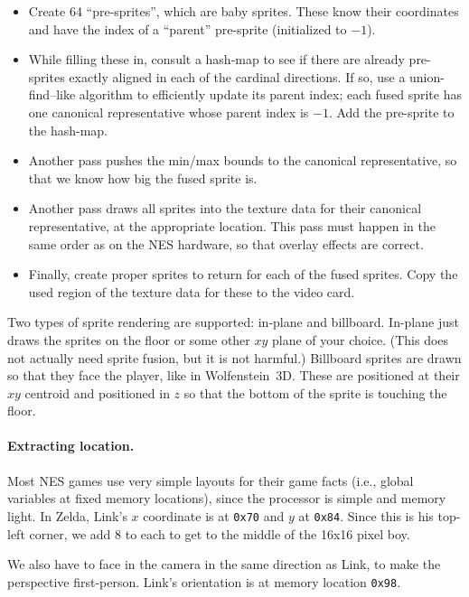 \documentclass[twocolumn]{article}
\begin{document}
\begin{itemize}
\item Create 64 ``pre-sprites'', which are baby sprites. These know
  their coordinates and have the index of a ``parent'' pre-sprite
  (initialized to $-1$).
\item While filling these in, consult a hash-map to see if there are
  already pre-sprites exactly aligned in each of the cardinal
  directions. If so, use a union-find--like algorithm\cite{tarjan1975efficiency}
  to efficiently update its parent index; each fused sprite has one
  canonical representative whose parent index is $-1$. Add the
  pre-sprite to the hash-map.
\item Another pass pushes the min/max bounds to the canonical representative,
  so that we know how big the fused sprite is.
\item Another pass draws all sprites into the texture data for their
  canonical representative, at the appropriate location. This pass must
  happen in the same order as on the NES hardware, so that overlay effects
  are correct.
\item Finally, create proper sprites to return for each of the fused sprites.
  Copy the used region of the texture data for these to the video card.
\end{itemize}


Two types of sprite rendering are supported: in-plane and billboard.
In-plane just draws the sprites on the floor or some other $xy$ plane
of your choice. (This does not actually need sprite fusion, but it is
not harmful.) Billboard sprites are drawn so that they face the
player, like in Wolfenstein~3D. These are positioned at their $xy$
centroid and positioned in $z$ so that the bottom of the sprite is
touching the floor.

\paragraph{Extracting location.}

Most NES games use very simple layouts for their game facts (i.e.,
global variables at fixed memory locations), since the processor is
simple and memory light.\cite{murphy2013first} In Zelda, Link's
$x$ coordinate is at \verb+0x70+ and $y$ at \verb+0x84+. Since this
is his top-left corner, we add 8 to each to get to the middle of the
16x16 pixel boy.

We also have to face in the camera in the same direction as Link, to
make the perspective first-person. Link's orientation is at memory
location \verb+0x98+.
\end{document}
